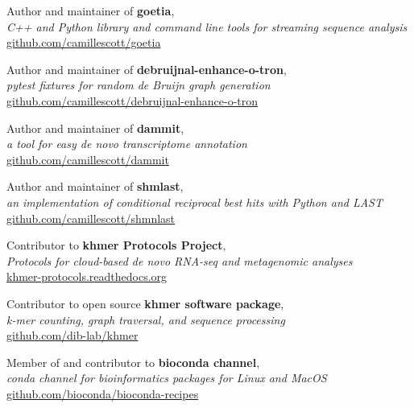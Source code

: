 \documentclass[resmargin,12pt]{camille_resume}
\begin{document}
\begin{resume}
\begin{list1}
\item[] Author and maintainer of {\bf goetia},\\
{\em C++ and Python library and command line tools for streaming sequence analysis}\\
\hfill \href{https://github.com/camillescott/goetia}{github.com/camillescott/goetia}\\

\item[] Author and maintainer of {\bf debruijnal-enhance-o-tron},\\
{\em pytest fixtures for random de Bruijn graph generation}\\
\hfill \href{https://github.com/camillescott/debruijnal-enhance-o-tron}{github.com/camillescott/debruijnal-enhance-o-tron}\\

\item[] Author and maintainer of {\bf dammit},\\
{\em a tool for easy de novo transcriptome annotation}\\
\hfill \href{https://github.com/camillescott/dammit}{github.com/camillescott/dammit}\\

\item[] Author and maintainer of {\bf shmlast},\\
{\em an implementation of conditional reciprocal best hits with Python and LAST}\\
\hfill \href{https://github.com/camillescott/shmlast}{github.com/camillescott/shmnlast}\\

\item[] Contributor to {\bf khmer Protocols Project},\\
{\em Protocols for cloud-based de novo RNA-seq and metagenomic analyses}\\
\hfill \href{https://khmer-protocols.readthedocs.org/}{khmer-protocols.readthedocs.org}\\

\item[] Contributor to open source {\bf khmer software package},\\ 
{\em k-mer counting, graph traversal, and sequence processing}\\
\hfill \href{https://github.com/ged-lab/khmer/}{github.com/dib-lab/khmer}\\

\item[] Member of and contributor to {\bf bioconda channel},\\
{\em conda channel for bioinformatics packages for Linux and MacOS}\\
\hfill \href{https://github.com/bioconda/bioconda-recipes}{github.com/bioconda/bioconda-recipes}\\




\end{list1}
\end{resume}
\end{document}
